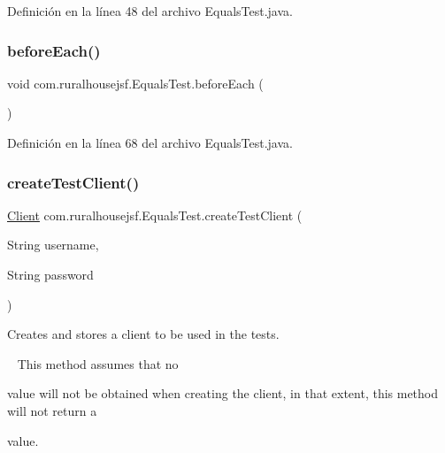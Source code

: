 Definición en la línea 48 del archivo Equals\+Test.\+java.

\mbox{\label{classcom_1_1ruralhousejsf_1_1_equals_test_ac6b6f6de31519a6882e0ec812b03442c}} 
\subsubsection{\texorpdfstring{beforeEach()}{beforeEach()}}
{\footnotesize\ttfamily void com.\+ruralhousejsf.\+Equals\+Test.\+before\+Each (\begin{DoxyParamCaption}{ }\end{DoxyParamCaption})\hspace{0.3cm}{\ttfamily [package]}}



Definición en la línea 68 del archivo Equals\+Test.\+java.

\mbox{\label{classcom_1_1ruralhousejsf_1_1_equals_test_a08081415d14d86f7b8a63fe7270546dc}} 
\subsubsection{\texorpdfstring{createTestClient()}{createTestClient()}}
{\footnotesize\ttfamily \mbox{\hyperlink{classcom_1_1ruralhousejsf_1_1domain_1_1_client}{Client}} com.\+ruralhousejsf.\+Equals\+Test.\+create\+Test\+Client (\begin{DoxyParamCaption}\item[{String}]{username,  }\item[{String}]{password }\end{DoxyParamCaption})\hspace{0.3cm}{\ttfamily [private]}}



Creates and stores a client to be used in the tests. 

~\newline
 This method assumes that no
\begin{DoxyCode}{0}
\DoxyCodeLine{\textcolor{keyword}{null} }
\end{DoxyCode}
 value will not be obtained when creating the client, in that extent, this method will not return a 
\begin{DoxyCode}{0}
\DoxyCodeLine{\textcolor{keyword}{null} }
\end{DoxyCode}
 value. 

